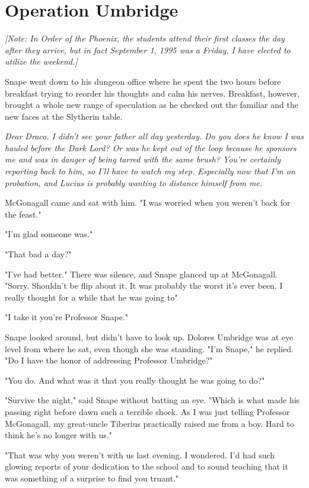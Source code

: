 
\chapter{Operation Umbridge}

\emph{[Note: In Order of the Phoenix, the students attend their first classes the day after they arrive, but in fact September 1, 1995 was a Friday. I have elected to utilize the weekend.]}

Snape went down to his dungeon office where he spent the two hours before breakfast trying to reorder his thoughts and calm his nerves. Breakfast, however, brought a whole new range of speculation as he checked out the familiar and the new faces at the Slytherin table.

\emph{Dear Draco. I didn't see your father all day yesterday. Do you{\el} does he know I was hauled before the Dark Lord? Or was he kept out of the loop because he sponsors me and was in danger of being tarred with the same brush? You're certainly reporting back to him, so I'll have to watch my step. Especially now that I'm on probation, and Lucius is probably wanting to distance himself from me.}

McGonagall came and sat with him. "I was worried when you weren't back for the feast."

"I'm glad someone was."

"That bad a day?"

"I've had better." There was silence, and Snape glanced up at McGonagall. "Sorry. Shouldn't be flip about it. It was probably the worst it's ever been. I really thought for a while that he was going to{\el}"

"I take it you're Professor Snape."

Snape looked around, but didn't have to look up. Dolores Umbridge was at eye level from where he sat, even though she was standing. "I'm Snape," he replied. "Do I have the honor of addressing Professor Umbridge?"

"You do. And what was it that you really thought he was going to do?"

"Survive the night," said Snape without batting an eye. "Which is what made his passing right before dawn such a terrible shock. As I was just telling Professor McGonagall, my great-uncle Tiberius practically raised me from a boy. Hard to think he's no longer with us."

"That was why you weren't with us last evening. I wondered. I'd had such glowing reports of your dedication to the school and to sound teaching that it was something of a surprise to find you truant."

